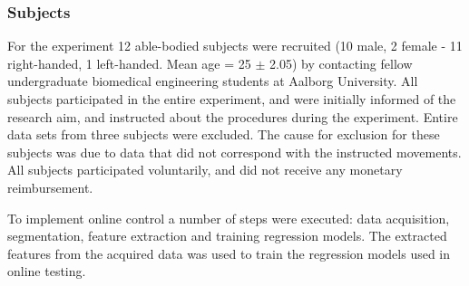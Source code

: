 \begin{multicols}{2}
%		
\subsubsection*{Subjects}
For the experiment 12 able-bodied subjects were recruited (10 male, 2 female - 11 right-handed, 1 left-handed. Mean age = 25 $\pm$ 2.05) by contacting fellow undergraduate biomedical engineering students at Aalborg University. All subjects participated in the entire experiment, and were initially informed of the research aim, and instructed about the procedures during the experiment. Entire data sets from three subjects were excluded. The cause for exclusion for these subjects was due to data that did not correspond with the instructed movements. All subjects participated voluntarily, and did not receive any monetary reimbursement. 

To implement online control a number of steps were executed: data acquisition, segmentation, feature extraction and training regression models. The extracted features from the acquired data was used to train the regression models used in online testing.


\end{multicols}

